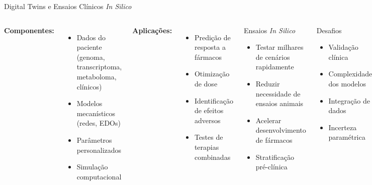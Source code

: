 \begin{frame}{Digital Twins e Ensaios Clínicos \textit{In Silico}}

\vspace{0.3cm}

\begin{columns}
\textbf{Componentes:}
\begin{itemize}
    \item Dados do paciente (genoma, transcriptoma, metaboloma, clínicos)
    \item Modelos mecanísticos (redes, EDOs)
    \item Parâmetros personalizados
    \item Simulação computacional
\end{itemize}

\vspace{0.3cm}

\textbf{Aplicações:}
\begin{itemize}
    \item Predição de resposta a fármacos
    \item Otimização de dose
    \item Identificação de efeitos adversos
    \item Testes de terapias combinadas
\end{itemize}

\begin{exampleblock}{Ensaios \textit{In Silico}}
\begin{itemize}
    \item Testar milhares de cenários rapidamente
    \item Reduzir necessidade de ensaios animais
    \item Acelerar desenvolvimento de fármacos
    \item Stratificação pré-clínica
\end{itemize}
\end{exampleblock}

\vspace{0.3cm}

\begin{alertblock}{Desafios}
\begin{itemize}
    \item Validação clínica
    \item Complexidade dos modelos
    \item Integração de dados
    \item Incerteza paramétrica
\end{itemize}
\end{alertblock}
\end{columns}
\end{frame}

